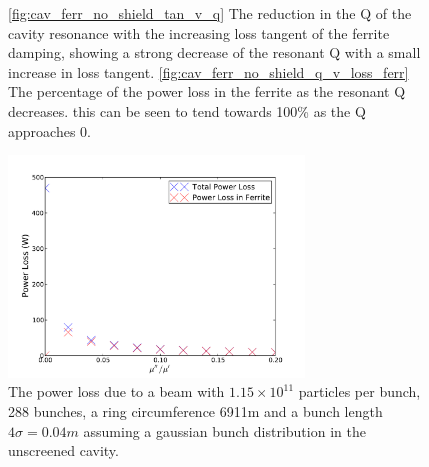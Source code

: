 \begin{figure}
\label{fig:no_screen_res_alterations}
\caption{\ref{fig:cav_ferr_no_shield_tan_v_q} The reduction in the Q of the cavity resonance with the increasing loss tangent of the ferrite damping, showing a strong decrease of the resonant Q with a small increase in loss tangent. \ref{fig:cav_ferr_no_shield_q_v_loss_ferr} The percentage of the power loss in the ferrite as the resonant Q decreases. this can be seen to tend towards 100\% as the Q approaches 0.}
\end{figure}

\begin{figure}
\begin{center}
\includegraphics[width=0.7\textwidth]{Beam_Coupling_Impedance_Reduction_Techniques/figures/no_screen_loss_tan_vs_power.pdf}
\end{center}
\label{fig:no_screen_loss_tan_v_power}
\caption{The power loss due to  a beam with $1.15 \times 10^{11}$ particles per bunch, 288 bunches, a ring circumference 6911m and a bunch length $4\sigma = 0.04m$ assuming a gaussian bunch distribution in the unscreened cavity.}
\end{figure}

